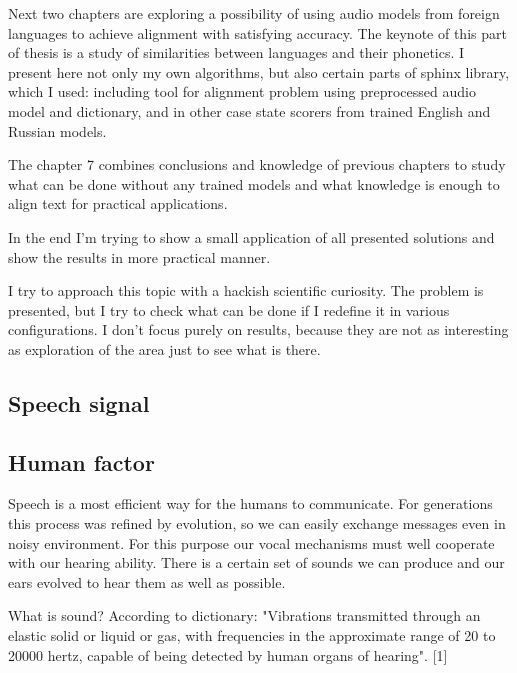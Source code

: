 \documentclass[12pt,a4paper,english]{article}
\begin{document}
Next two chapters are exploring a possibility of using audio models from foreign languages to achieve alignment with satisfying accuracy.
The keynote of this part of thesis is a study of similarities between languages and their phonetics. I present here not only my own algorithms, but also certain parts of sphinx library, which I used: including tool for alignment problem using preprocessed audio model and dictionary, and in other case state scorers from trained English and Russian models. \newline

The chapter 7 combines conclusions and knowledge of previous chapters to study what can be done without any trained models and what knowledge is enough to align text for practical applications. \newline

In the end I'm trying to show a small application of all presented solutions and show the results in more practical manner. \newline

I try to approach this topic with a hackish scientific curiosity. The problem is presented, but I try to check what can be done if I redefine it in various configurations. I don't focus purely on results, because they are not as interesting as exploration of the area just to see what is there. \newline

\newpage
\begin{center}
    \section{Speech signal}
\end {center}
\subsection{Human factor}

Speech is a most efficient way for the humans to communicate. For generations this process was refined by evolution, so we can easily exchange messages even in noisy environment. For this purpose our vocal mechanisms must well cooperate with our hearing ability. There is a certain set of sounds we can produce and our ears evolved to hear them as well as possible.\newline 

What is sound? According to dictionary: "Vibrations transmitted through an elastic solid or liquid or gas, with frequencies in the approximate range of 20 to 20000 hertz, capable of being detected by human organs of hearing". [1]\newline
\end{document}
